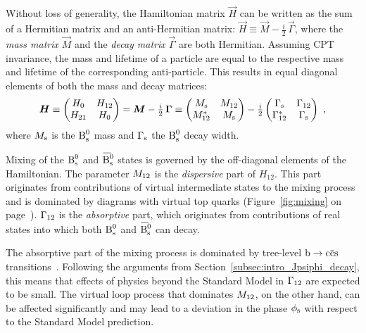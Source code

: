Without loss of generality, the Hamiltonian matrix $\vec{H}$ can be written as the sum of a Hermitian matrix and an anti-Hermitian matrix:
$\vec{H} \equiv \vec{M} - \tfrac{i}{2}\,\vec{\Gamma}$, where the \emph{mass matrix} $\vec{M}$ and the \emph{decay matrix} $\vec{\Gamma}$
are both Hermitian. Assuming CPT invariance, the mass and lifetime of a particle are equal to the respective mass and lifetime of the
corresponding anti-particle. This results in equal diagonal elements of both the mass and decay matrices:
\begin{equation}
  \label{eq:timeEvolHamil}
  \bm{H}
    \equiv \begin{pmatrix} H_0 & H_{12} \\ H_{21} & H_0 \end{pmatrix}
    = \bm{M} - \tfrac{i}{2}\,\bm{\Gamma}
    \equiv \begin{pmatrix} M_\text{s} & M_\text{12} \\ M_\text{12}^* & M_\text{s} \end{pmatrix}
      - \tfrac{i}{2} \begin{pmatrix} \Gamma_\text{s} & \Gamma_\text{12} \\ \Gamma_\text{12}^* & \Gamma_\text{s} \end{pmatrix}
    \ ,
\end{equation}
where $M_\text{s}$ is the $\text{B}_\text{s}^\text{0}$ mass and $\Gamma_\text{s}$ the $\text{B}_\text{s}^\text{0}$ decay width.

Mixing of the $\text{B}_\text{s}^\text{0}$ and $\Bsbar$ states is governed by the off-diagonal elements of the Hamiltonian. The parameter $M_\text{12}$ is the
\emph{dispersive} part of $H_{12}$. This part originates from contributions of virtual intermediate states to the mixing process and is
dominated by diagrams with virtual top quarks (Figure~\ref{fig:mixing} on page~\pageref{fig:mixing}). $\Gamma_\text{12}$ is the \emph{absorptive}
part, which originates from contributions of real states into which both $\text{B}_\text{s}^\text{0}$ and $\Bsbar$ can decay.

The absorptive part of the mixing process is dominated by tree-level $\btoccs$ transitions~\cite{Lenz:2006hd,*Lenz:2011ti}. Following the
arguments from Section~\ref{subsec:intro_Jpsiphi_decay}, this means that effects of physics beyond the Standard Model in $\Gamma_\text{12}$ are
expected to be small. The virtual loop process that dominates $M_\text{12}$, on the other hand, can be affected significantly and may lead to a
deviation in the phase $\phi_\text{s}$ with respect to the Standard Model prediction.

